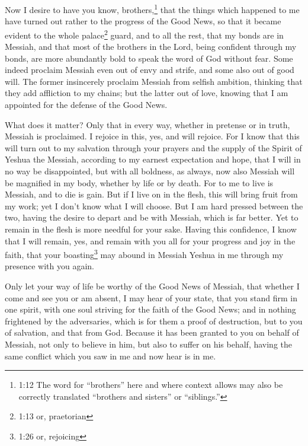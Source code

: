 \myverse{}Now I desire to have you know, brothers,\footnote{1:12 The word for “brothers” here and where context allows may also be correctly translated “brothers
	and sisters” or “siblings.”} that the things which happened to me have turned out rather to the
progress of the Good News,
\myverse{}so that it became evident to the whole palace\footnote{1:13 or, praetorian
} guard, and to all the rest, that my bonds are in Messiah,
\myverse{}and that most of the brothers in the Lord, being confident through my bonds,
are more abundantly bold to speak the word of God without fear.
\myverse{}Some indeed proclaim Messiah even out of envy and strife, and some also out
of good will.
\myverse{}The former insincerely proclaim Messiah from selfish ambition, thinking that
they add affliction to my chains;
\myverse{}but the latter out of love, knowing that I am appointed for the defense of
the Good News.

\myverse{}What does it matter? Only that in every way, whether in pretense
or in truth, Messiah is proclaimed. I rejoice in this, yes, and will rejoice.
\myverse{}For I know that this will turn out to my salvation through your prayers and
the supply of the Spirit of Yeshua the Messiah,
\myverse{}according to my earnest expectation and hope, that I will in no way be disappointed,
but with all boldness, as always, now also Messiah will be magnified in my body, whether by life or by
death.
\myverse{}For to me to live is Messiah, and to die is gain.
\myverse{}But if I live on in the flesh, this will bring fruit from my work; yet I don’t
know what I will choose.
\myverse{}But I am hard pressed between the two, having the desire to depart and be
with Messiah, which is far better.
\myverse{}Yet to remain in the flesh is more needful for your sake.
\myverse{}Having this confidence, I know that I will remain, yes, and remain with you
all for your progress and joy in the faith,
\myverse{}that your boasting\footnote{1:26 or, rejoicing} may abound in Messiah Yeshua in me through my presence with you again.

\myverse{}Only let your way of life be worthy of the Good News of Messiah,
that whether I come and see you or am absent, I may hear of your state, that you stand firm in one spirit,
with one soul striving for the faith of the Good News;
\myverse{}and in nothing frightened by the adversaries, which is for them a proof of
destruction, but to you of salvation, and that from God.
\myverse{}Because it has been granted to you on behalf of Messiah, not only to believe
in him, but also to suffer on his behalf,
\myverse{}having the same conflict which you saw in me and now hear is in me.


